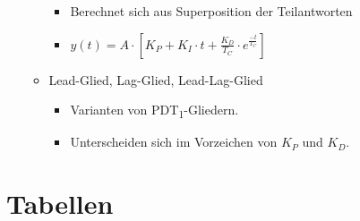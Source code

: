 \documentclass[margin=normal]{tex/hsrzf}
\begin{document}
\begin{itemize}
\begin{itemize}
\begin{itemize}
\begin{itemize}
                                    \end{itemize}
                              \item Berechnet sich aus Superposition der Teilantworten
                              \item $y(t) = A \cdot [K_P + K_I \cdot t + \frac{K_D}{T_C} \cdot e^{\frac{-t}{T_C}}]$
                        \end{itemize}
                  \item Lead-Glied, Lag-Glied, Lead-Lag-Glied
                        \begin{itemize}
                              \item Varianten von PDT\textsubscript{1}-Gliedern.
                              \item Unterscheiden sich im Vorzeichen von $K_P$ und $K_D$.
                        \end{itemize}

            \end{itemize}
\end{itemize}



\section{Tabellen}
\end{document}
